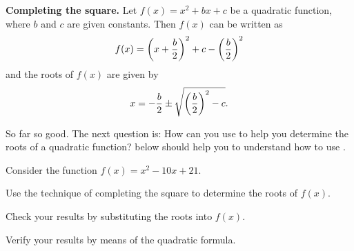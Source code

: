 \documentclass[a4paper,oneside,12pt]{article}
\begin{document}
\begin{theorem}
\label{thm:quadroots:monic_quadratic_roots}
\textbf{Completing the square.}
Let $f(x) = x^2 + bx + c$ be a quadratic function, where $b$ and $c$
are given constants.  Then $f(x)$ can be written as
\[
f(x)
=
\parenthesis*{x + \frac{b}{2}}^2
+
c
-
\parenthesis*{\frac{b}{2}}^2
\]
and the roots of $f(x)$ are given by
\[
x
=
-\frac{b}{2}
\pm
\sqrt{
  \parenthesis*{\frac{b}{2}}^2 - c
}.
\]
\end{theorem}

So far so good.  The next question is: How can you use
 to help you determine
the roots of a quadratic function?
 below
should help you to understand how to use
.

\begin{example}
\label{eg:quadroots:completing_square_monic_bminus10_c21}
Consider the function $f(x) = x^2 - 10x + 21$.
\begin{packedenum}
\item\label{subeg:quadroots:completing_square_roots_a1_bminus10_c21}
  Use the technique of completing the square to determine the roots of
  $f(x)$.

\item\label{subeg:quadroots:completing_square_verify_substitution_a1_bminus10_c21}
  Check your results by substituting the roots into $f(x)$.

\item\label{subeg:quadroots:completing_square_verify_quadform_a1_bminus10_c21}
  Verify your results by means of the quadratic formula.
\end{packedenum}
\end{example}
\end{document}
